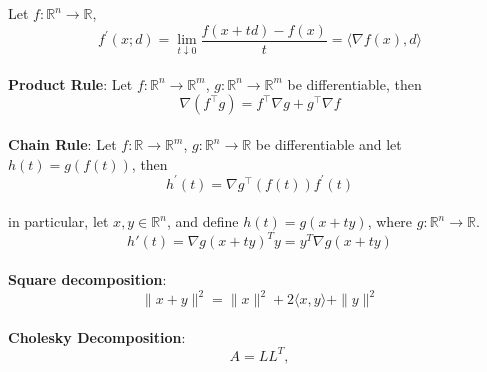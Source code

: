 {\begin{theorem}[]{}
    Let $f: \mathbb{R}^n \rightarrow \mathbb{R}$,
    \vspace{-4pt}\\
    \begin{equation*}
        f^\prime(x; d) = \lim_{t \downarrow 0} \frac{f(x + td) - f(x)}{t} = \langle \nabla f(x), d \rangle
    \end{equation*}
    \vspace{-4pt}\\
    \textbf{Product Rule}:
    Let $f: \mathbb{R}^n \rightarrow \mathbb{R}^m$, $g: \mathbb{R}^n \rightarrow \mathbb{R}^m$ be differentiable, then
    \vspace{-4pt}\\
    \begin{equation*}
        \nabla (f^\top g) = f^\top \nabla g + g^\top \nabla f
    \end{equation*}
    \vspace{-4pt}\\
    \textbf{Chain Rule}:
    Let $f: \mathbb{R} \rightarrow \mathbb{R}^m$, $g: \mathbb{R}^n \rightarrow \mathbb{R}$ be differentiable and let $h(t) = g(f(t))$, then
    \vspace{-4pt}\\
    \begin{equation*}
        h^\prime(t)=\nabla g^\top\left(f(t)\right) f^\prime(t)
    \end{equation*}
    \vspace{-4pt}\\
    in particular, let $x,y\in\mathbb{R}^n$, and define $h(t)=g(x+ty)$, where $g:\mathbb{R}^n\to\mathbb{R}$.
    \vspace{-4pt}\\
    $$
    h'(t)=\nabla g(x+ty)^T y = y^T\nabla g(x+ty)
    $$
    \vspace{-5pt}\\
    \textbf{Square decomposition}:
    \vspace{-5pt}\\
    \begin{equation*}
        \|x+y\|^2 = \|x\|^2 + 2\langle x, y \rangle + \|y\|^2
    \end{equation*}
    \vspace{-5pt}\\
    \textbf{Cholesky Decomposition}:
    \vspace{-5pt}\\
    \begin{equation*}
        A = LL^T, 
    \end{equation*}

\end{theorem}}
